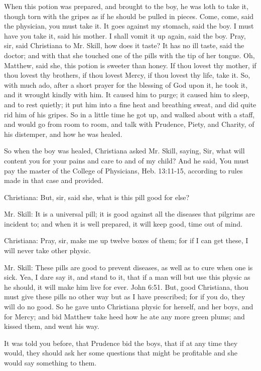 When this potion was prepared, and brought to the boy, he was loth to take it, though torn with the gripes as if he should be pulled in pieces. Come, come, said the physician, you must take it. It goes against my stomach, said the boy. I must have you take it, said his mother. I shall vomit it up again, said the boy. Pray, sir, said Christiana to Mr. Skill, how does it taste? It has no ill taste, said the doctor; and with that she touched one of the pills with the tip of her tongue. Oh, Matthew, said she, this potion is sweeter than honey. If thou lovest thy mother, if thou lovest thy brothers, if thou lovest Mercy, if thou lovest thy life, take it. So, with much ado, after a short prayer for the blessing of God upon it, he took it, and it wrought kindly with him. It caused him to purge; it caused him to sleep, and to rest quietly; it put him into a fine heat and breathing sweat, and did quite rid him of his gripes. So in a little time he got up, and walked about with a staff, and would go from room to room, and talk with Prudence, Piety, and Charity, of his distemper, and how he was healed.

So when the boy was healed, Christiana asked Mr. Skill, saying, Sir, what will content you for your pains and care to and of my child? And he said, You must pay the master of the College of Physicians, Heb. 13:11-15, according to rules made in that case and provided.

Christiana: But, sir, said she, what is this pill good for else?

Mr. Skill: It is a universal pill; it is good against all the diseases that pilgrims are incident to; and when it is well prepared, it will keep good, time out of mind.

Christiana: Pray, sir, make me up twelve boxes of them; for if I can get these, I will never take other physic.

Mr. Skill: These pills are good to prevent diseases, as well as to cure when one is sick. Yea, I dare say it, and stand to it, that if a man will but use this physic as he should, it will make him live for ever. John 6:51. But, good Christiana, thou must give these pills no other way but as I have prescribed; for if you do, they will do no good. So he gave unto Christiana physic for herself, and her boys, and for Mercy; and bid Matthew take heed how he ate any more green plums; and kissed them, and went his way.

It was told you before, that Prudence bid the boys, that if at any time they would, they should ask her some questions that might be profitable and she would say something to them.

